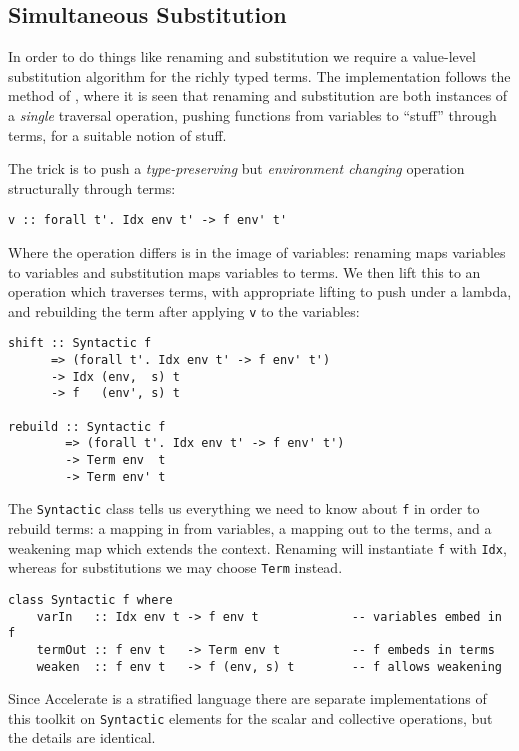 \subsection{Simultaneous Substitution}
\label{sec:substitution}

In order to do things like renaming
and substitution
we require a value-level substitution algorithm for the richly typed terms. The
implementation follows the method of \citet{McBride:2006,McBride:2005}, where it
is seen that renaming and substitution are both instances of a \emph{single}
traversal operation, pushing functions from variables to ``stuff'' through
terms, for a suitable notion of stuff.

The trick is to push a \emph{type-preserving} but \emph{environment changing}
operation structurally through terms:
%
\begin{lstlisting}[style=haskell]
v :: forall t'. Idx env t' -> f env' t'
\end{lstlisting}
%
Where the operation differs is in the image of variables: renaming maps
variables to variables and substitution maps variables to terms. We then lift
this to an operation which traverses terms, with appropriate lifting to push
under a lambda, and rebuilding the term after applying \texttt{v} to the
variables:
%
\begin{lstlisting}[style=haskell,mathescape]
shift :: Syntactic f
      => (forall t'. Idx env t' -> f env' t')
      -> Idx (env,  s) t
      -> f   (env', s) t

rebuild :: Syntactic f
        => (forall t'. Idx env t' -> f env' t')
        -> Term env  t
        -> Term env' t
\end{lstlisting}
%
The \texttt{Syntactic} class tells us everything we need to know about
\texttt{f} in order to rebuild terms: a mapping in from variables, a mapping out
to the terms, and a weakening map which extends the context. Renaming will
instantiate \texttt{f} with \texttt{Idx}, whereas for substitutions we may
choose \texttt{Term} instead.
%
\begin{lstlisting}[style=haskell]
class Syntactic f where
    varIn   :: Idx env t -> f env t             -- variables embed in f
    termOut :: f env t   -> Term env t          -- f embeds in terms
    weaken  :: f env t   -> f (env, s) t        -- f allows weakening
\end{lstlisting}
%
Since Accelerate is a stratified language there are separate implementations of
this toolkit on \texttt{Syntactic} elements for the scalar and collective
operations, but the details are identical.

